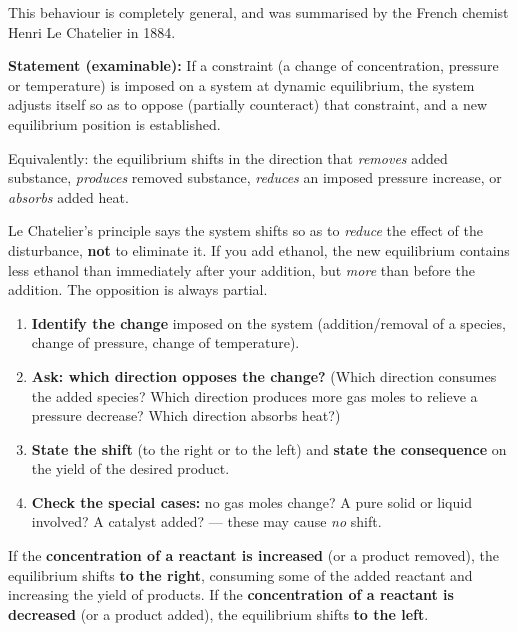 \documentclass[11pt]{article}
\newcommand{\cle}[1]{{\popxbold\color{popdark}#1}}
\newcounter{popsec}
\newcounter{popsub}
\newcommand{\courssub}[1]{%
  \stepcounter{popsub}%
  \par\vspace{9pt}\noindent{\popxbold\fontsize{11.5}{13}\selectfont\color{popink}{\color{poporange}\thepopsec.\thepopsub}\hspace{6pt}#1}\par\nopagebreak\vspace{4pt}
}
\begin{document}
This behaviour is completely general, and was summarised by the French chemist Henri Le Chatelier in 1884.

\begin{propriete}
\textbf{Statement (examinable):} If a constraint (a change of concentration, pressure or temperature) is imposed on a system at dynamic equilibrium, the system adjusts itself so as to \cle{oppose} (partially counteract) that constraint, and a new equilibrium position is established.

Equivalently: the equilibrium shifts in the direction that \emph{removes} added substance, \emph{produces} removed substance, \emph{reduces} an imposed pressure increase, or \emph{absorbs} added heat.
\end{propriete}

\begin{attention}
Le Chatelier's principle says the system shifts so as to \emph{reduce} the effect of the disturbance, \textbf{not} to eliminate it. If you add ethanol, the new equilibrium contains less ethanol than immediately after your addition, but \emph{more} than before the addition. The opposition is always partial.
\end{attention}

\begin{methode}
\begin{enumerate}
\item \textbf{Identify the change} imposed on the system (addition/removal of a species, change of pressure, change of temperature).
\item \textbf{Ask: which direction opposes the change?} (Which direction consumes the added species? Which direction produces more gas moles to relieve a pressure decrease? Which direction absorbs heat?)
\item \textbf{State the shift} (to the right or to the left) and \textbf{state the consequence} on the yield of the desired product.
\item \textbf{Check the special cases:} no gas moles change? A pure solid or liquid involved? A catalyst added? --- these may cause \emph{no} shift.
\end{enumerate}
\end{methode}

\courssub{Effect of Changing Concentration}

\begin{propriete}
If the \textbf{concentration of a reactant is increased} (or a product removed), the equilibrium shifts \textbf{to the right}, consuming some of the added reactant and increasing the yield of products. If the \textbf{concentration of a reactant is decreased} (or a product added), the equilibrium shifts \textbf{to the left}.
\end{propriete}
\end{document}
